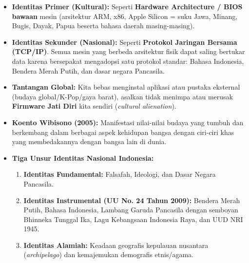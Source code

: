 \documentclass[10pt,a4paper]{article}
\begin{document}
\begin{analogibox}
\begin{itemize}
  \item \textbf{Identitas Primer (Kultural):} Seperti \textbf{Hardware Architecture / BIOS bawaan} mesin (arsitektur ARM, x86, Apple Silicon = suku Jawa, Minang, Bugis, Dayak, Papua beserta bahasa daerah masing-masing).
  \item \textbf{Identitas Sekunder (Nasional):} Seperti \textbf{Protokol Jaringan Bersama (TCP/IP)}. Semua mesin yang berbeda arsitektur fisik dapat saling bertukar data karena bersepakat mengadopsi satu protokol standar: Bahasa Indonesia, Bendera Merah Putih, dan dasar negara Pancasila.
  \item \textbf{Tantangan Global:} Kita bebas menginstal aplikasi atau pustaka eksternal (budaya global/K-Pop/gaya barat), asalkan tidak menimpa atau merusak \textbf{Firmware Jati Diri} kita sendiri (\textit{cultural alienation}).
\end{itemize}
\end{analogibox}

\begin{conceptbox}
\begin{itemize}
  \item \textbf{Koento Wibisono (2005):} Manifestasi nilai-nilai budaya yang tumbuh dan berkembang dalam berbagai aspek kehidupan bangsa dengan ciri-ciri khas yang membedakannya dengan bangsa lain di dunia.
  \item \textbf{Tiga Unsur Identitas Nasional Indonesia:}
  \begin{enumerate}
    \item \textbf{Identitas Fundamental:} Falsafah, Ideologi, dan Dasar Negara Pancasila.
    \item \textbf{Identitas Instrumental (UU No. 24 Tahun 2009):} Bendera Merah Putih, Bahasa Indonesia, Lambang Garuda Pancasila dengan semboyan Bhinneka Tunggal Ika, Lagu Kebangsaan Indonesia Raya, dan UUD NRI 1945.
    \item \textbf{Identitas Alamiah:} Keadaan geografis kepulauan nusantara (\textit{archipelago}) dan kemajemukan demografis etnis/agama.
  \end{enumerate}
\end{itemize}
\end{conceptbox}

\end{document}
